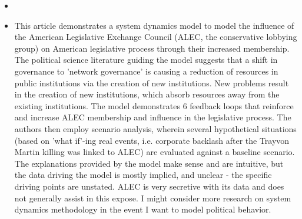 \documentclass{article}
\begin{document}
\begin{itemize}
\item \cite{andreasson2022ErodingPublic}
\item This article demonstrates a system dynamics model to model the influence of the American Legislative Exchange Council (ALEC, the conservative lobbying group) on American legislative process through their increased membership. The political science literature guiding the model suggests that a shift in governance to 'network governance' is causing a reduction of resources in public institutions via the creation of new institutions. New problems result in the creation of new institutions, which absorb resources away from the existing institutions. The model demonstrates 6 feedback loops that reinforce and increase ALEC membership and influence in the legislative process. The authors then employ scenario analysis, wherein several hypothetical situations (based on 'what if'-ing real events, i.e. corporate backlash after the Trayvon Martin killing was linked to ALEC) are evaluated against a baseline scenario. The explanations provided by the model make sense and are intuitive, but the data driving the model is mostly implied, and unclear - the specific driving points are unstated. ALEC is very secretive with its data and does not generally assist in this expose. I might consider more research on system dynamics methodology in the event I want to model political behavior.

\end{itemize}  
\end{document}
